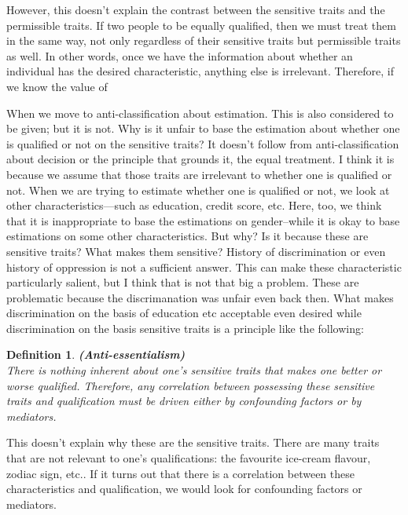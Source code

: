\documentclass{article}
\newtheorem{definition}{Definition}
\begin{document}
However, this doesn't explain the contrast between the sensitive traits and the permissible traits. If two people to be equally qualified, then we must treat them in the same way, not only regardless of their sensitive traits but permissible traits as well. In other words, once we have the information about whether an individual has the desired characteristic, anything else is irrelevant. Therefore, if we know the value of

When we move to anti-classification about estimation. This is also considered to be given; but it is not. Why is it unfair to base the estimation about whether one is qualified or not on the sensitive traits? It doesn't follow from anti-classification about decision or the principle that grounds it, the equal treatment. I think it is because we assume that those traits are irrelevant to whether one is qualified or not. When we are trying to estimate whether one is qualified or not, we look at other characteristics---such as education, credit score, etc. Here, too, we think that it is inappropriate to base the estimations on gender--while it is okay to base estimations on some other characteristics. But why? Is it because these are sensitive traits? What makes them sensitive? History of discrimination or even history of oppression is not a sufficient answer. This can make these characteristic particularly salient, but I think that is not that big a problem. These are problematic because the discrimanation was unfair even back then. What makes discrimination on the basis of education etc acceptable even desired while discrimination on the basis sensitive traits is a principle like the following:



\begin{definition}
\textup{\textbf{ (Anti-essentialism) } \\
There is nothing \textit{inherent} about one’s sensitive traits that makes one better or worse qualified. Therefore, any correlation between possessing these sensitive traits and qualification must be driven either by confounding factors or by mediators.}
\end{definition}

This doesn't explain why these are the sensitive traits. There are many traits that are not relevant to one's qualifications: the favourite ice-cream flavour, zodiac sign, etc.. If it turns out that there is a correlation between these characteristics and qualification, we would look for confounding factors or mediators. 
\end{document}
